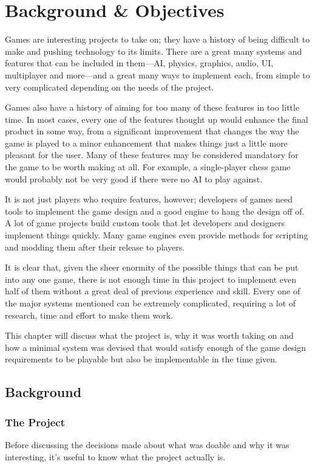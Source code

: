 \chapter{Background \& Objectives}

Games are interesting projects to take on; they have a history of being difficult to make and pushing technology to its limits. There are a great many systems and features that can be included in them---AI, physics, graphics, audio, UI, multiplayer and more---and a great many ways to implement each, from simple to very complicated depending on the needs of the project.

Games also have a history of aiming for too many of these features in too little time. In most cases, every one of the features thought up would enhance the final product in some way, from a significant improvement that changes the way the game is played to a minor enhancement that makes things just a little more pleasant for the user. Many of these features may be considered mandatory for the game to be worth making at all. For example, a single-player chess game would probably not be very good if there were no AI to play against.

It is not just players who require features, however; developers of games need tools to implement the game design and a good engine to hang the design off of. A lot of game projects build custom tools that let developers and designers implement things quickly. Many game engines even provide methods for scripting and modding them after their release to players.

It is clear that, given the sheer enormity of the possible things that can be put into any one game, there is not enough time in this project to implement even half of them without a great deal of previous experience and skill. Every one of the major systems mentioned can be extremely complicated, requiring a lot of research, time and effort to make them work.

This chapter will discuss what the project is, why it was worth taking on and how a minimal system was devised that would satisfy enough of the game design requirements to be playable but also be implementable in the time given.

\section{Background}

\subsection{The Project}
Before discussing the decisions made about what was doable and why it was interesting, it's useful to know what the project actually is.

